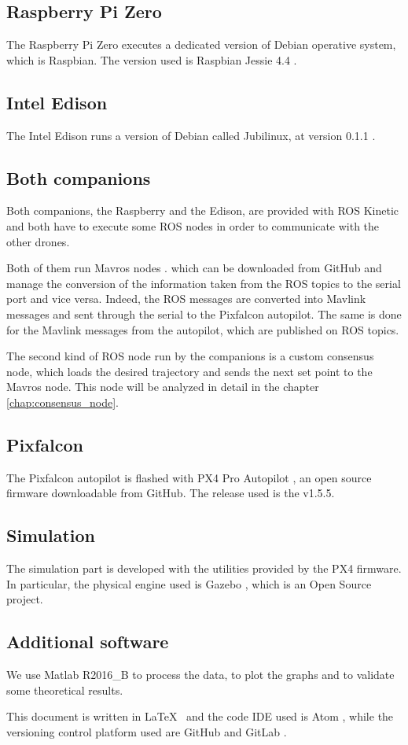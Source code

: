 \subsection{Raspberry Pi Zero}
The Raspberry Pi Zero executes a dedicated version of Debian operative system,
which is Raspbian. The version used is Raspbian Jessie 4.4 \cite{raspbian}.

\subsection{Intel Edison}
The Intel Edison runs a version of Debian called Jubilinux, at version 0.1.1 \cite{jubilinux}.

\subsection{Both companions}
Both companions, the Raspberry and the Edison, are provided with ROS Kinetic and
both have to execute some ROS nodes in order to communicate with the other drones.

Both of them run Mavros nodes \cite{mavros}.
which can be downloaded from GitHub and manage the conversion of the
information taken from the ROS topics to the serial port and vice versa. Indeed,
the ROS messages are converted into Mavlink messages and sent through the serial
to the Pixfalcon autopilot. The same is done for the Mavlink messages from the
autopilot, which are published on ROS topics.

The second kind of ROS node run by the companions is a custom consensus node, which
loads the desired trajectory and sends the next set point to the Mavros node.
This node will be analyzed in detail in the chapter \ref{chap:consensus_node}.

\subsection{Pixfalcon}
The Pixfalcon autopilot is flashed with PX4 Pro Autopilot \cite{px4},
an open source firmware downloadable from GitHub.
The release used is the v1.5.5.

\subsection{Simulation}
The simulation part is developed with the utilities provided by the PX4 firmware.
In particular, the physical engine used is Gazebo \cite{gazebo}, which is an Open
Source project.

\subsection{Additional software}
We use Matlab R2016\_B \cite{matlab} to process the data, to plot the graphs and
to validate some theoretical results.

This document is written in  \LaTeX \ \cite{latex} and the code IDE used is Atom \cite{atom},
while the versioning control platform used are GitHub \cite{github} and GitLab \cite{gitlab}.
